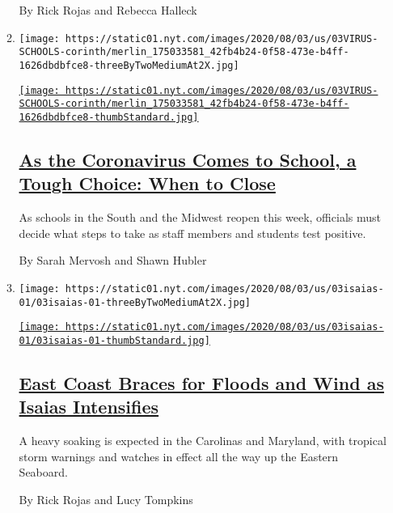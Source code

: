 \begin{enumerate}
\begin{enumerate}
    By Rick Rojas and Rebecca Halleck
  \item
    \texttt{[image: https://static01.nyt.com/images/2020/08/03/us/03VIRUS-SCHOOLS-corinth/merlin\_175033581\_42fb4b24-0f58-473e-b4ff-1626dbdbfce8-threeByTwoMediumAt2X.jpg]}

    \href{/2020/08/03/us/school-closing-coronavirus.html}{\texttt{[image: https://static01.nyt.com/images/2020/08/03/us/03VIRUS-SCHOOLS-corinth/merlin\_175033581\_42fb4b24-0f58-473e-b4ff-1626dbdbfce8-thumbStandard.jpg]}}

    \hypertarget{as-the-coronavirus-comes-to-school-a-tough-choice-when-to-close}{%
    \subsection{\texorpdfstring{\href{/2020/08/03/us/school-closing-coronavirus.html}{As
    the Coronavirus Comes to School, a Tough Choice: When to
    Close}}{As the Coronavirus Comes to School, a Tough Choice: When to Close}}\label{as-the-coronavirus-comes-to-school-a-tough-choice-when-to-close}}

    As schools in the South and the Midwest reopen this week, officials
    must decide what steps to take as staff members and students test
    positive.

    By Sarah Mervosh and Shawn Hubler
  \item
    \texttt{[image: https://static01.nyt.com/images/2020/08/03/us/03isaias-01/03isaias-01-threeByTwoMediumAt2X.jpg]}

    \href{/2020/08/03/us/isaias-east-coast-landfall.html}{\texttt{[image: https://static01.nyt.com/images/2020/08/03/us/03isaias-01/03isaias-01-thumbStandard.jpg]}}

    \hypertarget{east-coast-braces-for-floods-and-wind-as-isaias-intensifies}{%
    \subsection{\texorpdfstring{\href{/2020/08/03/us/isaias-east-coast-landfall.html}{East
    Coast Braces for Floods and Wind as Isaias
    Intensifies}}{East Coast Braces for Floods and Wind as Isaias Intensifies}}\label{east-coast-braces-for-floods-and-wind-as-isaias-intensifies}}

    A heavy soaking is expected in the Carolinas and Maryland, with
    tropical storm warnings and watches in effect all the way up the
    Eastern Seaboard.

    By Rick Rojas and Lucy Tompkins
  \end{enumerate}
\end{enumerate}

